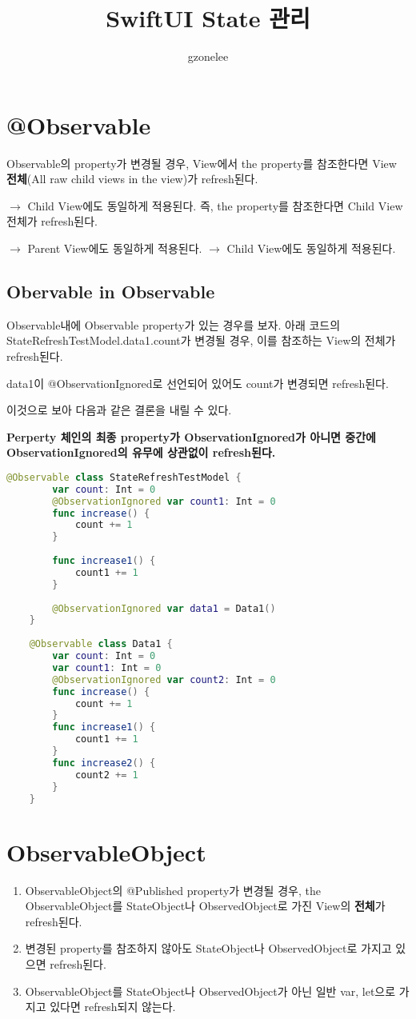 \documentclass{article}
\title{SwiftUI State 관리}
\author{gzonelee}
\begin{document}
\maketitle
   
\section{@Observable}
Observable의 property가 변경될 경우, View에서 the property를 참조한다면 View \textbf{전체}(All raw child views in the view)가 refresh된다.

$\rightarrow$ Child View에도 동일하게 적용된다. 즉, the property를 참조한다면 Child View 전체가 refresh된다.

$\rightarrow$ Parent View에도 동일하게 적용된다. $\rightarrow$ Child View에도 동일하게 적용된다.

\subsection{Obervable in Observable}
Observable내에 Observable property가 있는 경우를 보자.
아래 코드의 StateRefreshTestModel.data1.count가 변경될 경우, 이를 참조하는 View의 전체가 refresh된다.

data1이 @ObservationIgnored로 선언되어 있어도 count가 변경되면 refresh된다.

이것으로 보아 다음과 같은 결론을 내릴 수 있다.

\textbf{Perperty 체인의 최종 property가 ObservationIgnored가 아니면 중간에 ObservationIgnored의 유무에 상관없이 refresh된다.}

\begin{lstlisting}[language=Swift]
    @Observable class StateRefreshTestModel {
        var count: Int = 0
        @ObservationIgnored var count1: Int = 0
        func increase() {
            count += 1
        }
        
        func increase1() {
            count1 += 1
        }
        
        @ObservationIgnored var data1 = Data1()
    }
    
    @Observable class Data1 {
        var count: Int = 0
        var count1: Int = 0
        @ObservationIgnored var count2: Int = 0
        func increase() {
            count += 1
        }
        func increase1() {
            count1 += 1
        }
        func increase2() {
            count2 += 1
        }
    }
\end{lstlisting}


\section{ObservableObject}
\begin{enumerate}
\item ObservableObject의 @Published property가 변경될 경우, the ObservableObject를 StateObject나 ObservedObject로 가진 View의 \textbf{전체}가 refresh된다.
\item 변경된 property를 참조하지 않아도 StateObject나 ObservedObject로 가지고 있으면 refresh된다.
\item ObservableObject를 StateObject나 ObservedObject가 아닌 일반 var, let으로 가지고 있다면 refresh되지 않는다.
\end{enumerate}
\end{document}
